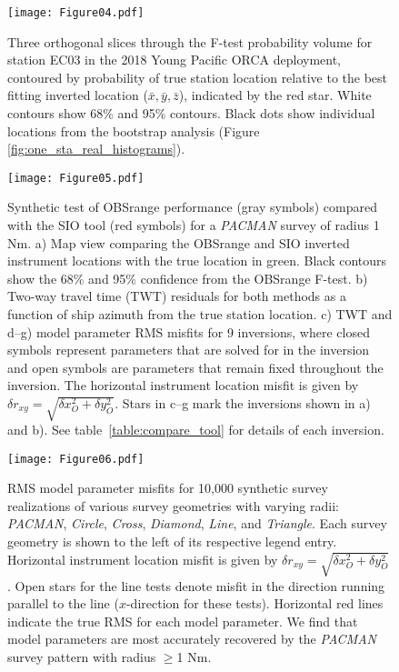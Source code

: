 \begin{figure}[h]
\texttt{[image: Figure04.pdf]}
\caption{ Three orthogonal slices through the F-test probability volume for station EC03 in the 2018 Young Pacific ORCA deployment, contoured by probability of true station location relative to the best fitting inverted location ($\bar{x},\bar{y},\bar{z}$), indicated by the red star. White contours show 68\% and 95\% contours. Black dots show individual locations from the bootstrap analysis (Figure \ref{fig:one_sta_real_histograms}). }
\label{fig:one_sta_real_ftests}
\end{figure}

\begin{figure}[h]
\texttt{[image: Figure05.pdf]}
\caption{ Synthetic test of OBSrange performance (gray symbols) compared with the SIO tool (red symbols) for a \textit{PACMAN} survey of radius 1 Nm. a) Map view comparing the OBSrange and SIO inverted instrument locations with the true location in green. Black contours show the 68\% and 95\% confidence from the OBSrange F-test. b) Two-way travel time (TWT) residuals for both methods as a function of ship azimuth from the true station location. c) TWT and d--g) model parameter RMS misfits for 9 inversions, where closed symbols represent parameters that are solved for in the inversion and open symbols are parameters that remain fixed throughout the inversion. The horizontal instrument location misfit is given by $\delta r_{xy} = \sqrt{\delta x_{O}^2 + \delta y_{O}^2} $. Stars in c--g mark the inversions shown in a) and b). See table~\ref{table:compare_tool} for details of each inversion.}
\label{fig:compare_tool}
\end{figure}

\begin{figure}[h]
\texttt{[image: Figure06.pdf]}
\caption{ RMS model parameter misfits for 10,000 synthetic survey realizations of various survey geometries with varying radii: \textit{PACMAN}, \textit{Circle}, \textit{Cross}, \textit{Diamond}, \textit{Line}, and \textit{Triangle}. Each survey geometry is shown to the left of its respective legend entry. Horizontal instrument location misfit is given by $\delta r_{xy} = \sqrt{\delta x_{O}^2 + \delta y_{O}^2} $. Open stars for the line tests denote misfit in the direction running parallel to the line ($x$-direction for these tests). Horizontal red lines indicate the true RMS for each model parameter. We find that model parameters are most accurately recovered by the \textit{PACMAN} survey pattern with radius $\geq$1 Nm. }
\label{fig:survey_geom_explore}
\end{figure}

